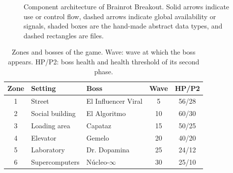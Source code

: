 \documentclass[conference]{IEEEtran}
\begin{document}
\begin{figure}[t]
{}
\caption{Component architecture of Brainrot Breakout. Solid arrows indicate use or control flow, dashed arrows indicate global availability or signals, shaded boxes are the hand-made abstract data types, and dashed rectangles are files.}
\label{p3-fig:arch}
\end{figure}

\begin{table}[t]
\caption{Zones and bosses of the game. Wave: wave at which the boss appears. HP/P2: boss health and health threshold of its second phase.}
\label{p3-tab:zones}
\centering
\footnotesize
\setlength{\tabcolsep}{3pt}
\begin{tabular}{clp{2.2cm}cc}
\toprule
\textbf{Zone} & \textbf{Setting} & \textbf{Boss} & \textbf{Wave} & \textbf{HP/P2} \\
\midrule
1 & Street & El Influencer Viral & 5 & 56/28 \\
2 & Social building & El Algoritmo & 10 & 60/30 \\
3 & Loading area & Capataz & 15 & 50/25 \\
4 & Elevator & Gemelo & 20 & 40/20 \\
5 & Laboratory & Dr. Dopamina & 25 & 24/12 \\
6 & Supercomputers & N\'ucleo-$\infty$ & 30 & 25/10 \\
\bottomrule
\end{tabular}
\end{table}
\end{document}

